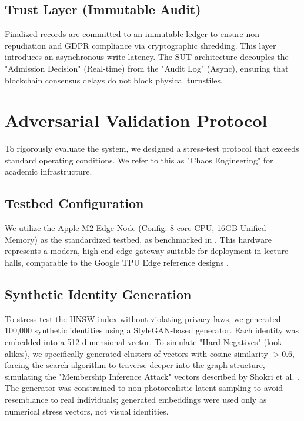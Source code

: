 \documentclass[conference]{IEEEtran}
\begin{document}
\subsection{Trust Layer (Immutable Audit)}
Finalized records are committed to an immutable ledger to ensure non-repudiation and GDPR compliance via cryptographic shredding. This layer introduces an asynchronous write latency. The SUT architecture decouples the "Admission Decision" (Real-time) from the "Audit Log" (Async), ensuring that blockchain consensus delays do not block physical turnstiles.

\section{Adversarial Validation Protocol}
To rigorously evaluate the system, we designed a stress-test protocol that exceeds standard operating conditions. We refer to this as "Chaos Engineering" for academic infrastructure.

\subsection{Testbed Configuration}
We utilize the Apple M2 Edge Node (Config: 8-core CPU, 16GB Unified Memory) as the standardized testbed, as benchmarked in \cite{p5}. This hardware represents a modern, high-end edge gateway suitable for deployment in lecture halls, comparable to the Google TPU Edge reference designs \cite{b12}.

\subsection{Synthetic Identity Generation}
To stress-test the HNSW index without violating privacy laws, we generated 100,000 synthetic identities using a StyleGAN-based generator. Each identity was embedded into a 512-dimensional vector. To simulate "Hard Negatives" (look-alikes), we specifically generated clusters of vectors with cosine similarity $>0.6$, forcing the search algorithm to traverse deeper into the graph structure, simulating the "Membership Inference Attack" vectors described by Shokri et al. \cite{b8}. The generator was constrained to non-photorealistic latent sampling to avoid resemblance to real individuals; generated embeddings were used only as numerical stress vectors, not visual identities.
\end{document}
